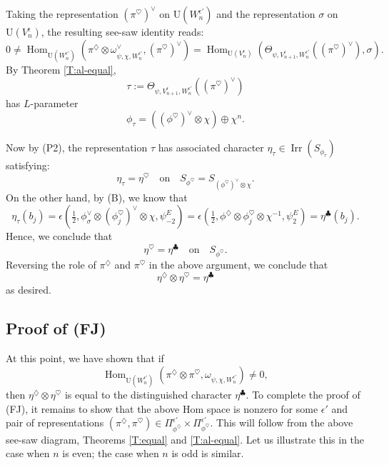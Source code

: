\documentclass[11pt]{amsart}
\numberwithin{equation}{section}
\theoremstyle{plain}
\theoremstyle{definition}
\theoremstyle{remark}
\def\Hom{\operatorname{Hom}}
\def\Irr{\operatorname{Irr}}
\def\U{\mathrm{U}}
\begin{document}
Taking the representation $(\pi^{\heartsuit})^{\vee}$ on $\U(W_n^{\epsilon'})$ and the representation $\sigma$ on $\U(V_n^{\epsilon})$, the resulting see-saw identity reads:
 \[  
 0 \ne \Hom_{\U(W_n^{\epsilon'})}( \pi^{\diamondsuit} \otimes \omega_{\psi, \chi, W_n^{\epsilon'}}^{\vee}, (\pi^{\heartsuit})^{\vee}) 
  = \Hom_{\U(V_n^{\epsilon})}( \Theta_{\psi, V_{n+1}^{\epsilon}, W_n^{\epsilon'}}((\pi^{\heartsuit})^{\vee}),  \sigma). \]
By Theorem \ref{T:al-equal}, 
 \[ \tau := \Theta_{\psi, V_{n+1}^{\epsilon}, W_n^{\epsilon'}}((\pi^{\heartsuit})^{\vee}) \]
has $L$-parameter
\[  \phi_{\tau} = ((\phi^{\heartsuit})^{\vee} \otimes  \chi) \oplus \chi^n. \]

Now by (P2), the representation $\tau$ has associated character $\eta_{\tau} \in \Irr(S_{\phi_{\tau}})$ satisfying:
\[  \eta_{\tau}  = 
 \eta^{\heartsuit} \quad \text{on} \quad S_{\phi^{\heartsuit}} = S_{(\phi^{\heartsuit})^{\vee} \otimes \chi}. \]
On the other hand, by (B), we know that
\[  \eta_{\tau}(b_j)  = \epsilon(\tfrac{1}{2}, \phi_\sigma^\vee \otimes (\phi_j^{\heartsuit})^{\vee} \otimes \chi, \psi^E_{-2})
=  \epsilon(\tfrac{1}{2}, \phi^{\diamondsuit} \otimes \phi^{\heartsuit}_j \otimes \chi^{-1}, \psi^E_2) = \eta^{\clubsuit}(b_j). \]
Hence, we conclude that
\[  \eta^{\heartsuit}  = \eta^{\clubsuit}  \quad \text{on} \quad S_{\phi^{\heartsuit}}. \]
Reversing the role of $\pi^{\diamondsuit}$ and $\pi^{\heartsuit}$ in the above argument, we conclude that
\[  \eta^{\diamondsuit} \otimes \eta^{\heartsuit}  =  \eta^{\clubsuit} \]
as desired.

\subsection{Proof of (FJ)} 

At this point, we have shown that if 
\[  \Hom_{\U(W_n^{\epsilon'})}(\pi^{\diamondsuit} \otimes \pi^{\heartsuit}, \omega_{\psi, \chi, W_n^{\epsilon'}}) \ne 0, \]
then  $\eta^{\diamondsuit} \otimes \eta^{\heartsuit} $ is equal to the distinguished character $\eta^{\clubsuit}$. To complete the proof of (FJ), it remains to show that the above Hom space is nonzero for some $\epsilon'$ and pair of representations $(\pi^{\diamondsuit}, \pi^{\heartsuit}) \in \Pi^{\epsilon'}_{\phi^{\diamondsuit}}  \times \Pi^{\epsilon'}_{\phi^{\heartsuit}}$.
This will follow from the above see-saw diagram, Theorems \ref{T:equal} and \ref{T:al-equal}. Let us illustrate this in the case when $n$ is even; the case when $n$ is odd is similar. 
\end{document}
